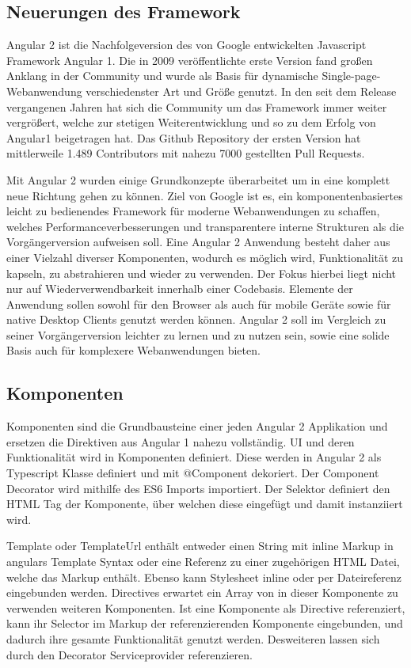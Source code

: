 \subsection{Neuerungen des Framework}

Angular 2 ist die Nachfolgeversion des von Google entwickelten Javascript Framework Angular 1.
Die in 2009 veröffentlichte erste Version fand großen Anklang in der Community
und wurde als Basis für dynamische Single-page-Webanwendung verschiedenster Art und Größe genutzt.
In den seit dem Release vergangenen Jahren hat sich die Community um das Framework immer weiter vergrößert,
welche zur stetigen Weiterentwicklung und so zu dem Erfolg von Angular1 beigetragen hat.
Das Github Repository der ersten Version hat mittlerweile 1.489 Contributors mit nahezu 7000 gestellten Pull Requests. \cite{ng1-github}

Mit Angular 2 wurden einige Grundkonzepte überarbeitet um in eine komplett neue Richtung gehen zu können.
Ziel von Google ist es, ein komponentenbasiertes leicht zu bedienendes Framework für moderne
Webanwendungen zu schaffen, welches Performanceverbesserungen und transparentere interne Strukturen als die Vorgängerversion aufweisen soll.
Eine Angular 2 Anwendung besteht daher aus einer Vielzahl diverser Komponenten, wodurch es möglich wird,
Funktionalität zu kapseln, zu abstrahieren und wieder zu verwenden. Der Fokus hierbei liegt nicht nur auf Wiederverwendbarkeit innerhalb einer Codebasis.
Elemente der Anwendung sollen sowohl für den Browser als auch für mobile Geräte sowie für native Desktop Clients genutzt werden können.
Angular 2 soll im Vergleich zu seiner Vorgängerversion leichter zu lernen und zu nutzen sein,
sowie eine solide Basis auch für komplexere Webanwendungen bieten. \cite[11-12]{Angular2}


\subsection{Komponenten}

Komponenten sind die Grundbausteine einer jeden Angular 2 Applikation und ersetzen die Direktiven aus Angular 1 nahezu vollständig.
UI und deren Funktionalität wird in Komponenten definiert.
Diese werden in Angular 2 als Typescript Klasse definiert und mit @Component dekoriert.
Der Component Decorator wird mithilfe des ES6 Imports importiert.
Der Selektor definiert den HTML Tag der Komponente, über welchen diese eingefügt und damit instanziiert wird.

Template oder TemplateUrl enthält entweder einen String mit inline Markup in angulars Template Syntax
oder eine Referenz zu einer zugehörigen HTML Datei, welche das Markup enthält.
Ebenso kann Stylesheet inline oder per Dateireferenz eingebunden werden.
Directives erwartet ein Array von in dieser Komponente zu verwenden weiteren Komponenten.
Ist eine Komponente als Directive referenziert,
kann ihr Selector im Markup der referenzierenden Komponente eingebunden,
und dadurch ihre gesamte Funktionalität genutzt werden.
Desweiteren lassen sich durch den Decorator Serviceprovider referenzieren.

